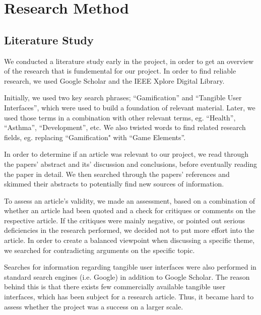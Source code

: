 \chapter{Research Method}
\label{chp:researchmethod}

\section{Literature Study}
\label{sec:literaturestudy}

We conducted a literature study early in the project, in order to get an overview of the research that is fundemental for our project. In order to find reliable research, we used Google Scholar and the IEEE Xplore Digital Library. 

Initially, we used two key search phrases; ``Gamification'' and ``Tangible User Interfaces'', which were used to build a foundation of relevant material. Later, we used those terms in a combination with other relevant terms, eg. ``Health'', ``Asthma'', ``Development'', etc. We also twisted words to find related research fields, eg. replacing ``Gamification" with ``Game Elements''. 

In order to determine if an article was relevant to our project, we read through the papers' abstract and its' discussion and conclusions, before eventually reading the paper in detail. We then searched through the papers' references and skimmed their abstracts to potentially find new sources of information. 

To assess an article's validity, we made an assessment, based on a combination of whether an article had been quoted and a check for critiques or comments on the respective article. If the critiques were mainly negative, or pointed out serious deficiencies in the research performed, we decided not to put more effort into the article. In order to create a balanced viewpoint when discussing a specific theme, we searched for contradicting arguments on the specific topic.  

Searches for information regarding tangible user interfaces were also performed in standard search engines (i.e. Google) in addition to Google Scholar. The reason behind this is that there exists few commercially available tangible user interfaces, which has been subject for a research article. Thus, it became hard to assess whether the project was a success on a larger scale. 
 
